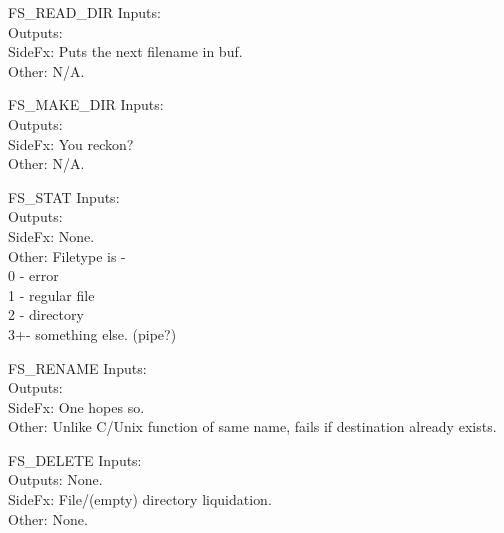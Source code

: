 \begin{sccall}{FS\_READ\_DIR}
  Inputs: \\
 Outputs: \\
  SideFx: Puts the next filename in buf.\\
   Other: N/A.
\end{sccall}
\begin{sccall}[]{FS\_MAKE\_DIR}
  Inputs: \\
 Outputs: \scargs{}\\
  SideFx: You reckon?\\
   Other: N/A.
\end{sccall}
\begin{sccall}[]{FS\_STAT}
  Inputs: \\
 Outputs: \\
  SideFx: None.\\
   Other: Filetype is -\\
           0 - error\\
	   1 - regular file\\
	   2 - directory\\
	   3+- something else. (pipe?)
\end{sccall}
\begin{sccall}[]{FS\_RENAME}
  Inputs: \\
 Outputs: \scargs{}\\
  SideFx: One hopes so.\\
   Other: Unlike C/Unix function of same name, fails if destination already exists.
\end{sccall}
\begin{sccall}[]{FS\_DELETE}
  Inputs: \\
 Outputs: None.\\
  SideFx: File/(empty) directory liquidation.\\
   Other: None.
\end{sccall}
